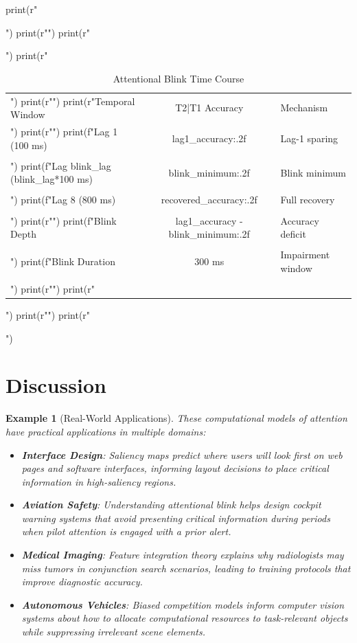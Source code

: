 \documentclass[a4paper, 11pt]{article}
\newtheorem{example}{Example}[section]
\begin{document}
\begin{pycode}
print(r"\begin{table}[htbp]")
print(r"\centering")
print(r"\caption{Attentional Blink Time Course}")
print(r"\begin{tabular}{lcl}")
print(r"\toprule")
print(r"Temporal Window & T2|T1 Accuracy & Mechanism \\")
print(r"\midrule")
print(f"Lag 1 (100 ms) & {lag1_accuracy:.2f} & Lag-1 sparing \\\\")
print(f"Lag {blink_lag} ({blink_lag*100} ms) & {blink_minimum:.2f} & Blink minimum \\\\")
print(f"Lag 8 (800 ms) & {recovered_accuracy:.2f} & Full recovery \\\\")
print(r"\midrule")
print(f"Blink Depth & {lag1_accuracy - blink_minimum:.2f} & Accuracy deficit \\\\")
print(f"Blink Duration & {300} ms & Impairment window \\\\")
print(r"\bottomrule")
print(r"\end{tabular}")
print(r"\label{tab:attentional_blink}")
print(r"\end{table}")
\end{pycode}

\section{Discussion}

\begin{example}[Real-World Applications]
These computational models of attention have practical applications in multiple domains:
\begin{itemize}
\item \textbf{Interface Design}: Saliency maps predict where users will look first on web pages and software interfaces, informing layout decisions to place critical information in high-saliency regions.
\item \textbf{Aviation Safety}: Understanding attentional blink helps design cockpit warning systems that avoid presenting critical information during periods when pilot attention is engaged with a prior alert.
\item \textbf{Medical Imaging}: Feature integration theory explains why radiologists may miss tumors in conjunction search scenarios, leading to training protocols that improve diagnostic accuracy.
\item \textbf{Autonomous Vehicles}: Biased competition models inform computer vision systems about how to allocate computational resources to task-relevant objects while suppressing irrelevant scene elements.
\end{itemize}
\end{example}
\end{document}
